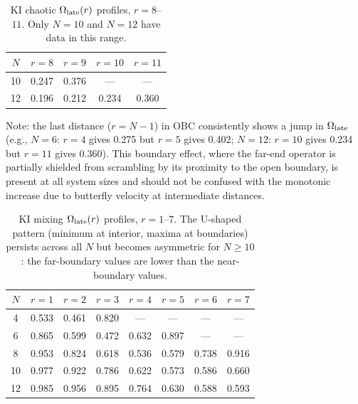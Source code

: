 \documentclass[twocolumn,showpacs,preprintnumbers,amsmath,amssymb,aps,prl]{revtex4-2}
\begin{document}
\begin{table}[h]
\caption{KI chaotic $\Omega_{\rm late}(r)$ profiles, $r = 8$--$11$. Only $N=10$
and $N=12$ have data in this range.}
\label{tab:kichaotic2}
\begin{ruledtabular}
\begin{tabular}{ccccc}
$N$ & $r{=}8$ & $r{=}9$ & $r{=}10$ & $r{=}11$ \\
\hline
10 & 0.247 & 0.376 & ---   & ---   \\
12 & 0.196 & 0.212 & 0.234 & 0.360 \\
\end{tabular}
\end{ruledtabular}
Note: the last distance ($r = N-1$) in OBC consistently shows a jump in
$\Omega_{\rm late}$ (e.g., $N=6$: $r=4$ gives 0.275 but $r=5$ gives 0.402;
$N=12$: $r=10$ gives 0.234 but $r=11$ gives 0.360). This boundary effect, where
the far-end operator is partially shielded from scrambling by its proximity to
the open boundary, is present at all system sizes and should not be confused with
the monotonic increase due to butterfly velocity at intermediate distances.
\end{table}

\begin{table}[h]
\caption{KI mixing $\Omega_{\rm late}(r)$ profiles, $r = 1$--$7$. The U-shaped
pattern (minimum at interior, maxima at boundaries) persists across all $N$ but
becomes asymmetric for $N \geq 10$: the far-boundary values are lower than the
near-boundary values.}
\label{tab:kimixing1}
\begin{ruledtabular}
\begin{tabular}{cccccccc}
$N$ & $r{=}1$ & $r{=}2$ & $r{=}3$ & $r{=}4$ & $r{=}5$ & $r{=}6$ & $r{=}7$ \\
\hline
4  & 0.533 & 0.461 & 0.820 & ---   & ---   & ---   & ---   \\
6  & 0.865 & 0.599 & 0.472 & 0.632 & 0.897 & ---   & ---   \\
8  & 0.953 & 0.824 & 0.618 & 0.536 & 0.579 & 0.738 & 0.916 \\
10 & 0.977 & 0.922 & 0.786 & 0.622 & 0.573 & 0.586 & 0.660 \\
12 & 0.985 & 0.956 & 0.895 & 0.764 & 0.630 & 0.588 & 0.593 \\
\end{tabular}
\end{ruledtabular}
\end{table}
\end{document}
